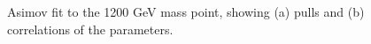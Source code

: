 \begin{figure}[htbp!]
\begin{center}
\caption{Asimov fit to the 1200 GeV mass point, showing (a) pulls and (b) correlations of the parameters.}
\label{fig:directfit:asimov1200}
\end{center}
\end{figure}

